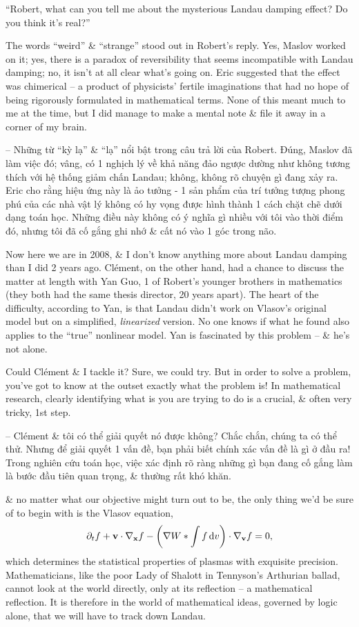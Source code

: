 \documentclass{article}
\begin{document}
\begin{enumerate}
	``Robert, what can you tell me about the mysterious Landau damping effect? Do you think it's real?''

	The words ``weird'' \& ``strange'' stood out in Robert's reply. Yes, Maslov worked on it; yes, there is a paradox of reversibility that seems incompatible with Landau damping; no, it isn't at all clear what's going on. Eric suggested that the effect was chimerical -- a product of physicists' fertile imaginations that had no hope of being rigorously formulated in mathematical terms. None of this meant much to me at the time, but I did manage to make a mental note \& file it away in a corner of my brain.

	-- Những từ ``kỳ lạ'' \& ``lạ'' nổi bật trong câu trả lời của Robert. Đúng, Maslov đã làm việc đó; vâng, có 1 nghịch lý về khả năng đảo ngược dường như không tương thích với hệ thống giảm chấn Landau; không, không rõ chuyện gì đang xảy ra. Eric cho rằng hiệu ứng này là ảo tưởng - 1 sản phẩm của trí tưởng tượng phong phú của các nhà vật lý không có hy vọng được hình thành 1 cách chặt chẽ dưới dạng toán học. Những điều này không có ý nghĩa gì nhiều với tôi vào thời điểm đó, nhưng tôi đã cố gắng ghi nhớ \& cất nó vào 1 góc trong não.

	Now here we are in 2008, \& I don't know anything more about Landau damping than I did 2 years ago. Cl\'ement, on the other hand, had a chance to discuss the matter at length with Yan Guo, 1 of Robert's younger brothers in mathematics (they both had the same thesis director, 20 years apart). The heart of the difficulty, according to Yan, is that Landau didn't work on Vlasov's original model but on a simplified, {\it linearized} version. No one knows if what he found also applies to the ``true'' nonlinear model. Yan is fascinated by this problem -- \& he's not alone.

	Could Cl\'ement \& I tackle it? Sure, we could try. But in order to solve a problem, you've got to know at the outset exactly what the problem is! In mathematical research, clearly identifying what is you are trying to do is a crucial, \& often very tricky, 1st step.

	-- Cl\'ement \& tôi có thể giải quyết nó được không? Chắc chắn, chúng ta có thể thử. Nhưng để giải quyết 1 vấn đề, bạn phải biết chính xác vấn đề là gì ở đầu ra! Trong nghiên cứu toán học, việc xác định rõ ràng những gì bạn đang cố gắng làm là bước đầu tiên quan trọng, \& thường rất khó khăn.

	\& no matter what our objective might turn out to be, the only thing we'd be sure of to begin with is the Vlasov equation,
	\begin{equation}
		\label{Vlasov}
		\partial_tf + {\bf v}\cdot\nabla_{\bf x}f - \left(\nabla W*\int f\,{\rm d}v\right)\cdot\nabla_{\bf v}f = 0,
	\end{equation}
	which determines the statistical properties of plasmas with exquisite precision. Mathematicians, like the poor Lady of Shalott in Tennyson's Arthurian ballad, cannot look at the world directly, only at its reflection -- a mathematical reflection. It is therefore in the world of mathematical ideas, governed by logic alone, that we will have to track down Landau.


\end{enumerate}
\end{document}
